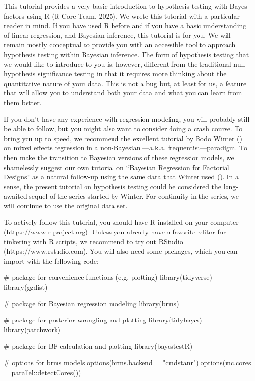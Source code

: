 \documentclass[
  doc,
  floatsintext,
  longtable,
  nolmodern,
  notxfonts,
  notimes,
  colorlinks=true,linkcolor=blue,citecolor=blue,urlcolor=blue]{apa7}
\newenvironment{Shaded}{\begin{snugshade}}{\end{snugshade}}
\newcommand{\AttributeTok}[1]{\textcolor[rgb]{0.40,0.45,0.13}{#1}}
\newcommand{\CommentTok}[1]{\textcolor[rgb]{0.37,0.37,0.37}{#1}}
\newcommand{\FunctionTok}[1]{\textcolor[rgb]{0.28,0.35,0.67}{#1}}
\newcommand{\NormalTok}[1]{\textcolor[rgb]{0.00,0.23,0.31}{#1}}
\newcommand{\SpecialCharTok}[1]{\textcolor[rgb]{0.37,0.37,0.37}{#1}}
\newcommand{\StringTok}[1]{\textcolor[rgb]{0.13,0.47,0.30}{#1}}
\begin{document}
This tutorial provides a very basic introduction to hypothesis testing
with Bayes factors using R (R Core Team, 2025). We wrote this tutorial
with a particular reader in mind. If you have used R before and if you
have a basic understanding of linear regression, and Bayesian inference,
this tutorial is for you. We will remain mostly conceptual to provide
you with an accessible tool to approach hypothesis testing within
Bayesian inference. The form of hypothesis testing that we would like to
introduce to you is, however, different from the traditional null
hypothesis significance testing in that it requires more thinking about
the quantitative nature of your data. This is not a bug but, at least
for us, a feature that will allow you to understand both your data and
what you can learn from them better.

If you don't have any experience with regression modeling, you will
probably still be able to follow, but you might also want to consider
doing a crash course. To bring you up to speed, we recommend the
excellent tutorial by Bodo Winter
() on mixed eﬀects
regression in a non-Bayesian ---a.k.a. frequentist---paradigm. To then
make the transition to Bayesian versions of these regression models, we
shamelessly suggest our own tutorial on ``Bayesian Regression for
Factorial Designs'' as a natural follow-up using the same data that
Winter used
(). In a sense, the present tutorial on hypothesis testing
could be considered the long-awaited sequel of the series started by
Winter. For continuity in the series, we will continue to use the
original data set.

To actively follow this tutorial, you should have R installed on your
computer (https://www.r-project.org). Unless you already have a favorite
editor for tinkering with R scripts, we recommend to try out RStudio
(https://www.rstudio.com). You will also need some packages, which you
can import with the following code:

\begin{Shaded}
\begin{Highlighting}[]
\CommentTok{\# package for convenience functions (e.g. plotting)}
\FunctionTok{library}\NormalTok{(tidyverse)}
\FunctionTok{library}\NormalTok{(ggdist)}

\CommentTok{\# package for Bayesian regression modeling}
\FunctionTok{library}\NormalTok{(brms)}

\CommentTok{\# package for posterior wrangling and plotting}
\FunctionTok{library}\NormalTok{(tidybayes)}
\FunctionTok{library}\NormalTok{(patchwork)}

\CommentTok{\# package for BF calculation and plotting}
\FunctionTok{library}\NormalTok{(bayestestR)}

\CommentTok{\# options for brms models }
\FunctionTok{options}\NormalTok{(}\AttributeTok{brms.backend =} \StringTok{"cmdstanr"}\NormalTok{)}
\FunctionTok{options}\NormalTok{(}\AttributeTok{mc.cores =}\NormalTok{ parallel}\SpecialCharTok{::}\FunctionTok{detectCores}\NormalTok{())}
\end{Highlighting}
\end{Shaded}
\end{document}
